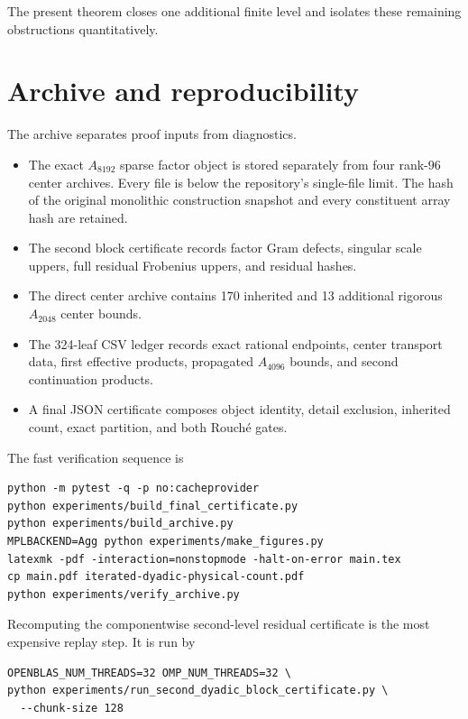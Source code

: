 \documentclass[11pt]{article}
\theoremstyle{definition}
\theoremstyle{remark}
\begin{document}
The present theorem closes one additional finite level and isolates these
remaining obstructions quantitatively.

\section{Archive and reproducibility}
\label{sec:archive}

The archive separates proof inputs from diagnostics.

\begin{itemize}[leftmargin=2em]
 \item The exact $A_{8192}$ sparse factor object is stored separately from
       four rank-$96$ center archives.  Every file is below the repository's
       single-file limit.  The hash of the original monolithic construction
       snapshot and every constituent array hash are retained.
 \item The second block certificate records factor Gram defects, singular
       scale uppers, full residual Frobenius uppers, and residual hashes.
 \item The direct center archive contains 170 inherited and 13 additional
       rigorous $A_{2048}$ center bounds.
 \item The 324-leaf CSV ledger records exact rational endpoints, center
       transport data, first effective products, propagated $A_{4096}$
       bounds, and second continuation products.
 \item A final JSON certificate composes object identity, detail exclusion,
       inherited count, exact partition, and both Rouch\'e gates.
\end{itemize}

The fast verification sequence is

\begin{verbatim}
python -m pytest -q -p no:cacheprovider
python experiments/build_final_certificate.py
python experiments/build_archive.py
MPLBACKEND=Agg python experiments/make_figures.py
latexmk -pdf -interaction=nonstopmode -halt-on-error main.tex
cp main.pdf iterated-dyadic-physical-count.pdf
python experiments/verify_archive.py
\end{verbatim}

Recomputing the componentwise second-level residual certificate is the most
expensive replay step.  It is run by

\begin{verbatim}
OPENBLAS_NUM_THREADS=32 OMP_NUM_THREADS=32 \
python experiments/run_second_dyadic_block_certificate.py \
  --chunk-size 128
\end{verbatim}
\end{document}
